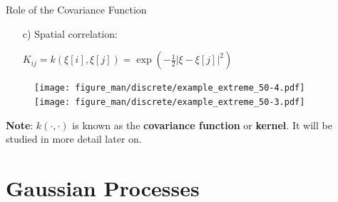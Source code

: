 \begin{vbframe}{Role of the Covariance Function}
\begin{itemize}
  \vspace*{0.2cm}
  \begin{enumerate}
    \item[c)] Spatial correlation: \begin{footnotesize}$K_{ij} = k(\xi[i], \xi[j]) = \exp\left(-\frac{1}{2}\left|\xi - \xi[j]\right|^2\right)$\end{footnotesize}
  \end{enumerate}
  
\begin{figure}
  \texttt{[image: figure\_man/discrete/example\_extreme\_50-4.pdf]} ~~  \texttt{[image: figure\_man/discrete/example\_extreme\_50-3.pdf]}
\end{figure}

\end{itemize}

\begin{footnotesize}
\textbf{Note}: $k(\cdot,\cdot)$ is known as the \textbf{covariance function} or \textbf{kernel}. It will be studied in more detail later on.
\end{footnotesize}

\end{vbframe}











\section{Gaussian Processes}


